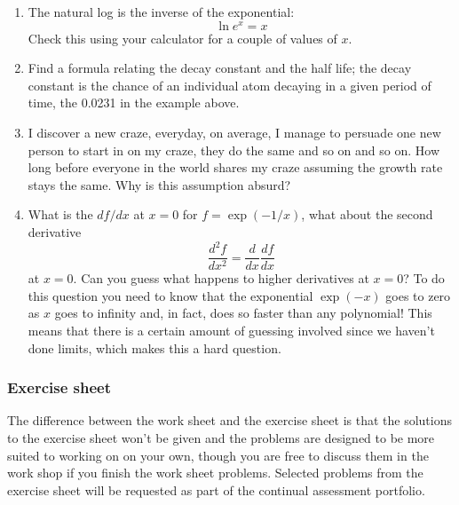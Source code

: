 \documentclass[12pt]{article}
\begin{document}
\begin{enumerate}
\item The natural log is the inverse of the exponential:
\begin{equation}
\ln e^x=x
\end{equation}
Check this using your calculator for a couple of values of $x$.

\item Find a formula relating the decay constant and the half life;
  the decay constant is the chance of an individual atom decaying in a
  given period of time, the 0.0231 in the example above.

\item I discover a new craze, everyday, on average, I manage to
  persuade one new person to start in on my craze, they do the same
  and so on and so on. How long before everyone in the world shares my
  craze assuming the growth rate stays the same. Why is this assumption absurd?

\item What is the $df/dx$ at $x=0$ for $f=\exp(-1/x)$, what about the second derivative 
\begin{equation}
\frac{d^2f}{dx^2}=\frac{d}{dx}\frac{df}{dx}
\end{equation}
at $x=0$. Can you guess what happens to higher derivatives at $x=0$?
To do this question you need to know that the exponential $\exp(-x)$
goes to zero as $x$ goes to infinity and, in fact, does so faster than
any polynomial! This means that there is a certain amount of guessing
involved since we haven't done limits, which makes this a hard question.

\end{enumerate}

\subsubsection*{Exercise sheet}

The difference between the work sheet and the exercise sheet is that
the solutions to the exercise sheet won't be given and the problems
are designed to be more suited to working on on your own, though you
are free to discuss them in the work shop if you finish the work sheet
problems. Selected problems from the exercise sheet will be requested
as part of the continual assessment portfolio.
\end{document}
